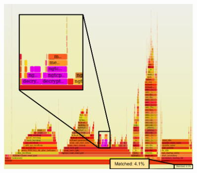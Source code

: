 \documentclass[12pt,a4paper,twoside,openright]{report}
\begin{document}
    \begin{figure}[H]
    \centering
    \includegraphics[width=0.9\textwidth]{figs/zoomed_unencrypted_flame_graph_1GByte_h2load.png}
    \caption{} 
    \label{fig:perf_results_of_unencrypted_h2load}
    \end{figure}
    
    
\end{document}

